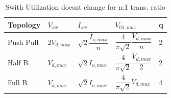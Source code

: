 \documentclass[twocolumn, ]{article}
\begin{document}
\begin{table}[H]
\centering
\begin{tabular}{lllll}
    Topology & $V_{sw}$ & $I_{sw}$ & $V_{01,max}$ & q \\
    \hline

    Push Pull & $2V_{d,max}$ & $\sqrt2 \dfrac{I_{o,max}}{n}$ & $\dfrac{4}{\pi \sqrt2} \dfrac{V_{d,max}}{n}$ & 2 \\
    Half B. & $V_{d,max}$ & $\sqrt2 I_{o,max}$ & $\dfrac{4}{\pi \sqrt2} \dfrac{V_{d,max}}{2}$ & 2 \\
    Full B. & $V_{d,max}$ & $\sqrt2 I_{o,max}$ & $\dfrac{4}{\pi \sqrt2} V_{d,max}$ & 4 \\
 \end{tabular}   
  \caption{Swith Utilization doesnt change for n:1 trans. ratio}
  
\end{table}
\end{document}
